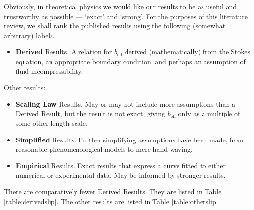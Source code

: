 \documentclass[a4paper]{report}
\newcommand{\beff}{\ensuremath{b_{\mathrm{eff}}}}
\begin{document}
Obviously, in theoretical physics we would like our results to be as useful and trustworthy as possible --- `exact' and `strong'.  For the purposes of this literature review, we shall rank the published results using the following (somewhat arbitrary) labels.

\begin{itemize}

\item \textbf{Derived} Results.  A relation for $\beff$ derived (mathematically) from the Stokes equation, an appropriate boundary condition, and perhaps an assumption of fluid incompressibility.

\end{itemize}

Other results:

\begin{itemize}

\item \textbf{Scaling Law} Results.  May or may not include more assumptions than a Derived Result, but the result is not exact, giving $\beff$ only as a multiple of some other length scale.

\item \textbf{Simplified} Results.  Further simplifying assumptions have been made, from reasonable phenomenological models to mere hand waving.

\item \textbf{Empirical} Results.  Exact results that express a curve fitted to either numerical or experimental data.  May be informed by stronger results.

\end{itemize}


There are comparatively fewer Derived Results.  They are listed in Table \ref{table:derivedslip}.  The other results are listed in Table \ref{table:otherslip}.
\end{document}
